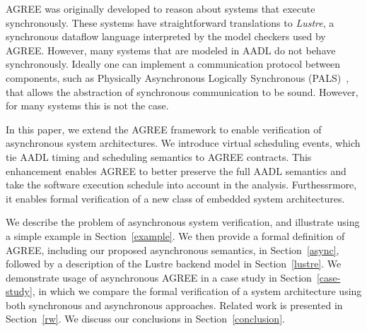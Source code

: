AGREE was originally developed to reason about systems that execute synchronously. These systems have straightforward translations to \emph{Lustre}, a synchronous dataflow language interpreted by the model checkers used by AGREE. However, many systems that are modeled in AADL do not behave synchronously. Ideally one can implement a communication protocol between components, such as Physically Asynchronous Logically Synchronous (PALS)~\cite{pals}, that allows the abstraction of synchronous communication to be sound. However, for many systems this is not the case.

In this paper, we extend the AGREE framework to enable verification of asynchronous system architectures. We introduce virtual scheduling events, which tie AADL timing and scheduling semantics to AGREE contracts. This enhancement enables AGREE to better preserve the full AADL semantics and take the software execution schedule into account in the analysis.  Furthessrmore, it enables formal verification of a new class of embedded system architectures. 

We describe the problem of asynchronous system verification, and illustrate using a simple example in Section~\ref{example}.  We then provide a formal definition of AGREE, including our proposed asynchronous semantics, in Section~\ref{async}, followed by a description of the Lustre backend model in Section~\ref{lustre}.  We demonstrate usage of asynchronous AGREE in a case study in Section~\ref{case-study}, in which we compare the formal verification of a system architecture using both synchronous and asynchronous approaches.  Related work is presented in Section~\ref{rw}.  We discuss our conclusions in Section~\ref{conclusion}.  
